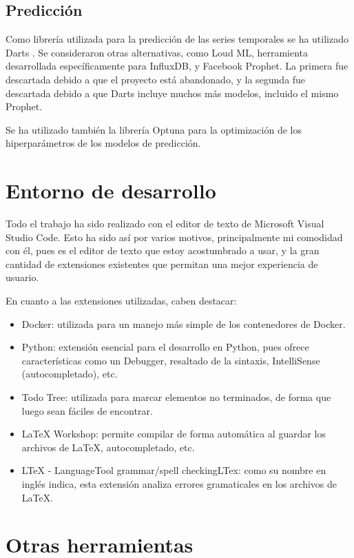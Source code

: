 \subsection{Predicción}

Como librería utilizada para la predicción de las series temporales se ha utilizado Darts \cite{JMLR:v23:21-1177}.
Se consideraron otras alternativas, como Loud ML, herramienta desarrollada específicamente para InfluxDB, y 
Facebook Prophet. La primera fue descartada debido a que el proyecto está abandonado, y la segunda fue descartada 
debido a que Darts incluye muchos más modelos, incluido el mismo Prophet.

Se ha utilizado también la librería Optuna\cite{optuna} para la optimización de los hiperparámetros de los modelos de predicción.

\section{Entorno de desarrollo}

Todo el trabajo ha sido realizado con el editor de texto de Microsoft Visual Studio Code. Esto ha sido así por 
varios motivos, principalmente mi comodidad con él, pues es el editor de texto que estoy acostumbrado a usar, y 
la gran cantidad de extensiones existentes que permitan una mejor experiencia de usuario.

En cuanto a las extensiones utilizadas, caben destacar:
\begin{itemize}
    \item Docker: utilizada para un manejo más simple de los contenedores de Docker.
    \item Python: extensión esencial para el desarrollo en Python, pues ofrece características como un Debugger, 
        resaltado de la sintaxis, IntelliSense (autocompletado), etc.
    \item Todo Tree: utilizada para marcar elementos no terminados, de forma que luego sean fáciles de encontrar.
    \item LaTeX Workshop: permite compilar de forma automática al guardar los archivos de LaTeX, autocompletado, etc.
    \item LTeX - LanguageTool grammar/spell checkingLTex: como su nombre en inglés indica, esta extensión analiza 
        errores gramaticales en los archivos de LaTeX.
\end{itemize}


\section{Otras herramientas}


